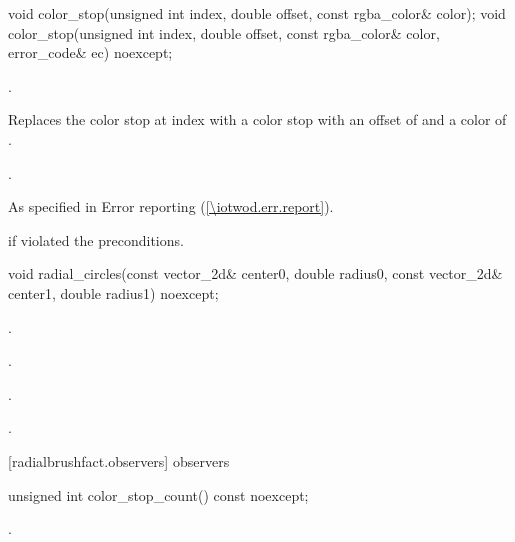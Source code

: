 \begin{itemdecl}
    void color_stop(unsigned int index, double offset, const rgba_color& color);
    void color_stop(unsigned int index, double offset, const rgba_color& color,
      error_code& ec) noexcept;
\end{itemdecl}
\begin{itemdescr}
	\pnum
	\requires
	.
	
	\pnum
	\effects
	Replaces the color stop at index  with a color stop with an offset of  and a color of .

	\pnum
	\postconditions
	.
	
	\pnum
	\throws
	As specified in Error reporting (\ref{\iotwod.err.report}).
	
	\pnum
	\errors
	 if  violated the preconditions.

\end{itemdescr}

\begin{itemdecl}
    void radial_circles(const vector_2d& center0, double radius0,
      const vector_2d& center1, double radius1) noexcept;
\end{itemdecl}
\begin{itemdescr}
	\pnum
	\postconditions
	.
	
	\pnum
	.
	
	\pnum
	.

	\pnum
	.

\end{itemdescr}

 [radialbrushfact.observers] { observers}

\begin{itemdecl}
    unsigned int color_stop_count() const noexcept;
\end{itemdecl}
\begin{itemdescr}
	\pnum
	\returns
	.

\end{itemdescr}

